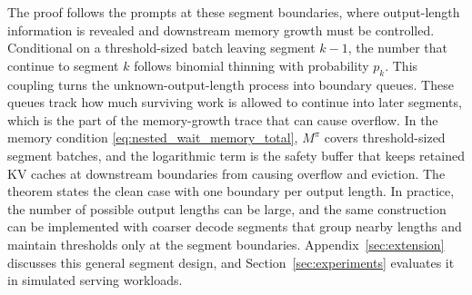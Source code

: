 The proof follows the prompts at these segment boundaries, where output-length information is revealed and downstream memory growth must be controlled. Conditional on a threshold-sized batch leaving segment \(k-1\), the number that continue to segment \(k\) follows binomial thinning with probability \(p_k\). This coupling turns the unknown-output-length process into boundary queues. These queues track how much surviving work is allowed to continue into later segments, which is the part of the memory-growth trace that can cause overflow. In the memory condition \eqref{eq:nested_wait_memory_total}, \(M^\pi\) covers threshold-sized segment batches, and the logarithmic term is the safety buffer that keeps retained KV caches at downstream boundaries from causing overflow and eviction. The theorem states the clean case with one boundary per output length. In practice, the number of possible output lengths can be large, and the same construction can be implemented with coarser decode segments that group nearby lengths and maintain thresholds only at the segment boundaries. Appendix~\ref{sec:extension} discusses this general segment design, and Section~\ref{sec:experiments} evaluates it in simulated serving workloads.
